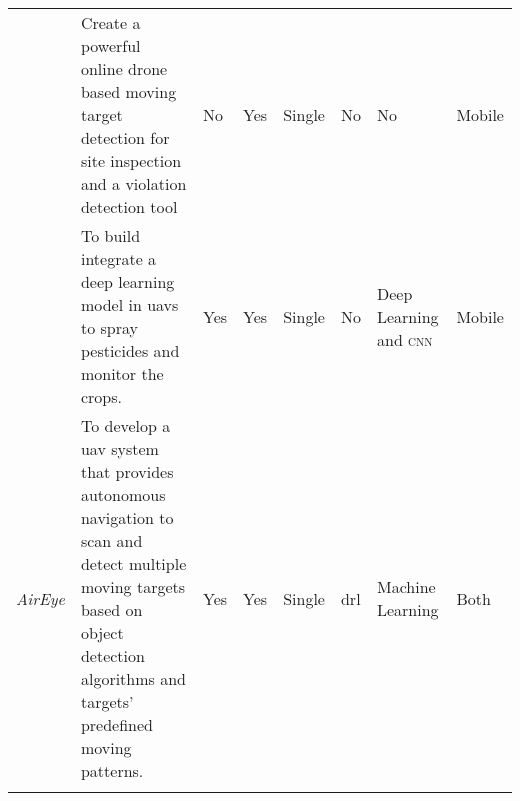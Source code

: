 {\begin{center}
\begin{footnotesize}
\begin{xltabular}{\textwidth}{ p{0.9cm} p{4cm} X X X X p{1.4cm} p{1.4cm} }
            \cite{Wang18} 
                & Create a powerful online drone 
                based moving target detection 
                for site inspection and 
                a violation detection tool 
                    & No 
                        & Yes 
            & Single 
                & No
                    & No
                        	& Mobile  \\ \addlinespace

            \cite{Khan21}
                & To build integrate a deep 
                learning model in \glspl{uav} to spray 
                pesticides and monitor the crops.
                    & Yes 
                        & Yes 
            & Single 
                & No
                	& Deep Learning and \textsc{cnn}     
                        	& Mobile \\ \addlinespace

			\textit{AirEye} 				 
				&To develop a \gls{uav} system that provides autonomous
				navigation to scan and detect multiple moving targets
				based on object detection algorithms and targets' predefined moving 
				patterns.	
					& Yes
						 & Yes 
			& Single 
				& \gls{drl}
					 & Machine Learning 
					 		& Both \\ \addlinespace
			
            \bottomrule
        \end{xltabular}
    \end{footnotesize}
\end{center}
}

